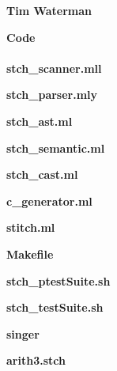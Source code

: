 \documentclass[11pt, oneside]{article}   	%
\newcommand{\tab} {\hspace*{2em}}
\begin{document}
\newpage
\Large\textbf{Tim Waterman}\\[1em]
\normalsize
\newpage

\newpage
\LARGE\textbf{Code}\\[2em]
\normalsize
\tab\\[2em]

\newpage
\Large\textbf{stch\_scanner.mll}\\[1em]
\normalsize

\newpage

\Large\textbf{stch\_parser.mly}\\[1em]
\normalsize

\newpage

\Large\textbf{stch\_ast.ml}\\[1em]
\normalsize

\newpage

\Large\textbf{stch\_semantic.ml}\\[1em]
\normalsize

\newpage

\Large\textbf{stch\_cast.ml}\\[1em]
\normalsize

\newpage

\Large\textbf{c\_generator.ml}\\[1em]
\normalsize

\newpage

\Large\textbf{stitch.ml}\\[1em]
\normalsize

\newpage

\Large\textbf{Makefile}\\[1em]
\normalsize

\newpage

\Large\textbf{stch\_ptestSuite.sh}\\[1em]
\normalsize

\newpage

\Large\textbf{stch\_testSuite.sh}\\[1em]
\normalsize

\newpage

\Large\textbf{singer}\\[1em]
\normalsize

\newpage

\newpage
\Large\textbf{arith3.stch}\\[1em]
\normalsize

\end{document}
